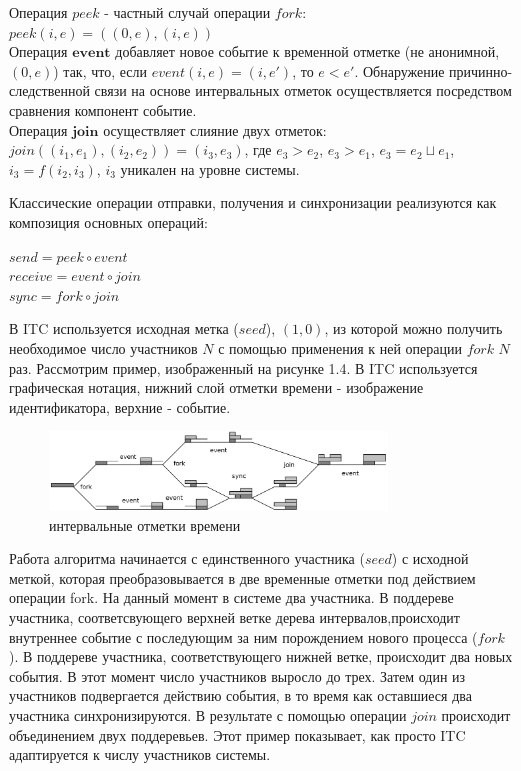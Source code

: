 Операция $peek$ - частный случай операции $fork$: $peek(i,e)=((0,e),(i,e))$\\
Операция $\textbf{event}$ добавляет новое событие к временной отметке (не анонимной, $(0,e)$) так, что, если $event(i,e) = (i,e')$, то $e < e'$. 
Обнаружение причинно-следственной связи на основе интервальных отметок осуществляется посредством сравнения компонент событие.\\
Операция $\textbf{join}$ осуществляет слияние двух отметок: $join((i_1,e_1),(i_2,e_2)) = (i_3,e_3)$, где
$e_3 > e_2$, $e_3 > e_1$, $e_3 = e_2 \sqcup e_1$, $i_3 = f(i_2,i_3)$, $i_3$ уникален на уровне системы.
\par
Классические операции отправки, получения и синхронизации реализуются как композиция основных операций:
\begin{center}
$send = peek \circ event$\\
$receive = event \circ join$\\
$sync = fork \circ join$
\end{center}
В ITC используется исходная метка ($seed$), $(1,0)$, из которой можно получить необходимое число участников $N$ с помощью применения к ней операции $fork$ $N$ раз.
Рассмотрим пример, изображенный на рисунке 1.4. В ITC используется графическая нотация, нижний слой отметки времени - изображение идентификатора, верхние - событие. 
\begin{figure}
\centering
\includegraphics[width=0.8\textwidth]{img/tree.png}
\caption{интервальные отметки времени}
\end{figure}
Работа алгоритма начинается с единственного участника ($seed$) с исходной меткой, которая преобразовывается в две временные отметки под действием операции fork. На данный момент в системе два участника. В поддереве участника, соответсвующего верхней ветке дерева интервалов,происходит внутреннее событие с последующим за ним порождением нового процесса ($fork$). В поддереве участника, соответствующего нижней ветке, происходит два новых события. В этот момент число участников выросло до трех. Затем один из участников подвергается действию события, в то время как оставшиеся два участника синхронизируются. В результате с помощью операции $join$ происходит объединением двух поддеревьев. Этот пример показывает, как просто ITC адаптируется к числу участников системы.



